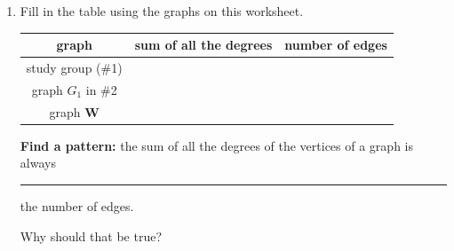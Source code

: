 \documentclass[12pt]{article}
\newcommand{\ans}[1][1in]{\rule{#1}{.5pt}}
\renewcommand{\emph}[1]{\textsf{\textbf{#1}}}
\begin{document}
\begin{enumerate}
\begin{enumerate}
\item Label each vertex of the \emph{right-hand} copy with its degree. Remember a loop counts twice.
\item Which vertex has the largest degree? \ans[.8in]
\item How many edges does \emph{W} have? \ans[.8in]
\item Find a circuit and highlight/draw it on the left-hand graph. \ans
\item Find a path from $e$ to $d$. Write the sequence of vertices \ans[1in]
\item Is there a vertex you could delete that would leave the graph \emph{not} connected? \ans[1cm] Why?


\end{enumerate}

\vspace{.3in}

\item Fill in the table using the graphs on this worksheet.

\begin{center}
{\renewcommand{\arraystretch}{1.6}
\begin{tabular}{c | c | c}
graph & sum of all the degrees & number of edges \\ \hline
study group (\#1) &  & \\ \hline
graph $G_{1}$ in \#2 & & \\ \hline
graph \emph{W} &  & \\ \hline
\end{tabular}
}
\end{center}



\emph{Find a pattern:} the sum of all the degrees of the vertices of a graph is always \ans[1.2in] the number of edges.

\bigskip

Why should that be true? %

%
%
%
%

\end{enumerate}
\end{document}
